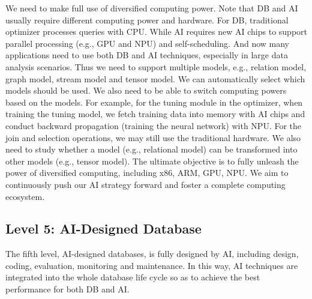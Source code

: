  We need to make full use of diversified computing power. Note that DB and AI usually require different computing power and hardware. For DB, traditional optimizer processes queries with CPU. While AI requires new AI chips to support parallel processing (e.g., GPU and NPU) and self-scheduling. And now many applications need to use both DB and AI techniques, especially in large data analysis scenarios.  Thus we need to support multiple models, e.g., relation model, graph model, stream model and tensor model. We can automatically select which models should be used. We also need to be able to switch computing powers based on the models. For example, for the tuning module in the optimizer, when training the tuning model, we fetch training data into memory with AI chips and conduct backward propagation (training the neural network) with NPU. For the join and selection operations, we may still use the traditional hardware. We also need to study whether a model (e.g., relational model) can be transformed into other models (e.g., tensor model).  The ultimate objective is to fully unleash the power of diversified computing, including x86, ARM, GPU, NPU. We aim to continuously push our AI strategy forward and foster a complete computing ecosystem. 







\subsection{Level 5: AI-Designed Database}
\label{subsec: designed}

The fifth level, AI-designed databases, is fully designed by AI, including design, coding, evaluation, monitoring and maintenance. In this way, AI techniques are integrated into the whole database life cycle so as to achieve the best performance for both DB and AI.

